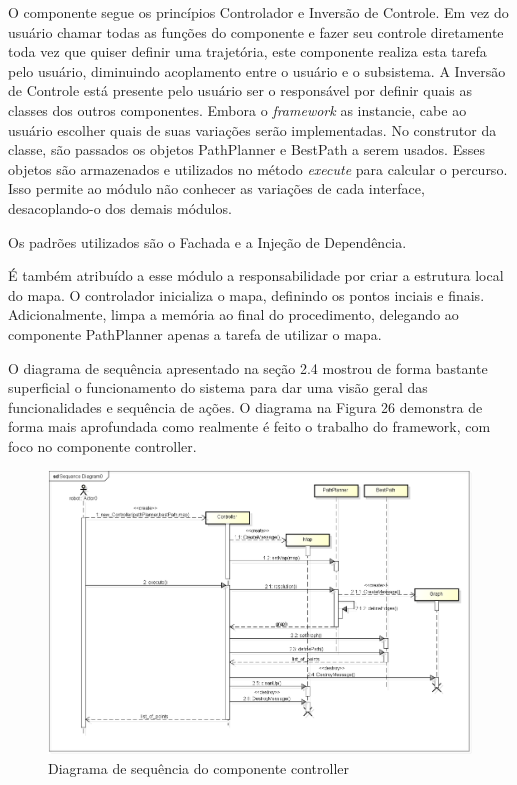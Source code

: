 O componente segue os princípios Controlador e Inversão de Controle. Em vez do usuário chamar todas as funções do componente e fazer seu controle diretamente toda vez que quiser definir uma trajetória, este componente realiza esta tarefa pelo usuário, diminuindo acoplamento entre o usuário e o subsistema. A Inversão de Controle está presente pelo usuário ser o responsável por definir quais as classes dos outros componentes. Embora o \textit{framework} as instancie, cabe ao usuário escolher quais de suas variações serão implementadas. No construtor da classe, são passados os objetos PathPlanner e BestPath a serem usados. Esses objetos são armazenados e utilizados no método \textit{execute} para calcular o percurso. Isso permite ao módulo não conhecer as variações de cada interface, desacoplando-o dos demais módulos.

Os padrões utilizados são o Fachada e a Injeção de Dependência.

É também atribuído a esse módulo a responsabilidade por criar a estrutura local do mapa. O controlador inicializa o mapa, definindo os pontos inciais e finais. Adicionalmente, limpa a memória ao final do procedimento, delegando ao componente PathPlanner apenas a tarefa de utilizar o mapa.

O diagrama de sequência apresentado na seção 2.4 mostrou de forma bastante superficial o funcionamento do sistema para dar uma visão geral das funcionalidades e sequência de ações. O diagrama na Figura 26 demonstra de forma mais aprofundada como realmente é feito o trabalho do framework, com foco no componente controller.

\begin{figure}[h]
	\centering
	\label{fig26}
		\includegraphics[keepaspectratio=true,scale=0.4]{figuras/executeController.png}
	\caption{Diagrama de sequência do componente controller}
\end{figure}

